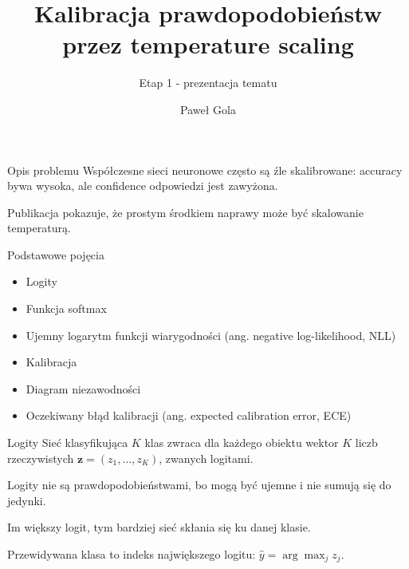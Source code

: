 \documentclass[aspectratio=169,professionalfonts,t]{beamer}
\begin{document}
\title{Kalibracja prawdopodobieństw przez temperature scaling}
\subtitle{Etap 1 - prezentacja tematu}
\author{Paweł Gola}
\date{}

\begin{frame}
  \titlepage
\end{frame}

\begin{frame}{Opis problemu}
  Współczesne sieci neuronowe często są źle skalibrowane: accuracy bywa wysoka, ale confidence odpowiedzi jest zawyżona.
  
  \vspace{0.5em}
  Publikacja pokazuje, że prostym środkiem naprawy może być skalowanie temperaturą.
  
  \vspace{1em}
\end{frame}

\begin{frame}{Podstawowe pojęcia}
  \begin{itemize}
    \item Logity
    \item Funkcja softmax
    \item Ujemny logarytm funkcji wiarygodności (ang. negative log-likelihood, NLL)
    \item Kalibracja
    \item Diagram niezawodności
    \item Oczekiwany błąd kalibracji (ang. expected calibration error, ECE)
  \end{itemize}
\end{frame}

\begin{frame}{Logity}
  Sieć klasyfikująca $K$ klas zwraca dla każdego obiektu wektor $K$ liczb rzeczywistych $\mathbf{z}=(z_1,\dots,z_K)$, zwanych logitami.
  
  Logity nie są prawdopodobieństwami, bo mogą być ujemne i nie sumują się do jedynki.
  
  Im większy logit, tym bardziej sieć skłania się ku danej klasie.

  \vspace{0.5em}
  Przewidywana klasa to indeks największego logitu: $\hat y=\arg\max_j z_j$.
\end{frame}
\end{document}
